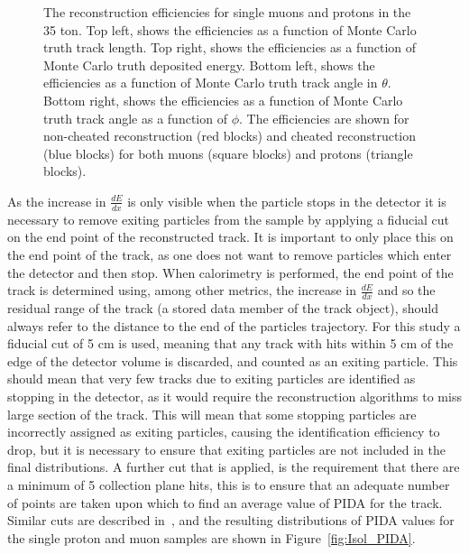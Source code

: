 \begin{figure}[h!]
  \caption[The reconstruction efficiencies for single muons and protons in the 35 ton.]
          {The reconstruction efficiencies for single muons and protons in the 35 ton. Top left, shows the efficiencies as a function of Monte Carlo truth track length. Top right, shows the efficiencies as a function of Monte Carlo truth deposited energy. Bottom left, shows the efficiencies as a function of Monte Carlo truth track angle in $\theta$. Bottom right, shows the efficiencies as a function of Monte Carlo truth track angle as a function of $\phi$. The efficiencies are shown for non-cheated reconstruction (red blocks) and cheated reconstruction (blue blocks) for both muons (square blocks) and protons (triangle blocks).}
  \label{fig:Isol_Effic}
\end{figure}

As the increase in $\frac{dE}{dx}$ is only visible when the particle stops in the detector it is necessary to remove exiting particles from the sample by applying a fiducial cut on the end point of the reconstructed track. It is important to only place this on the end point of the track, as one does not want to remove particles which enter the detector and then stop. When calorimetry is performed, the end point of the track is determined using, among other metrics, the increase in $\frac{dE}{dx}$ and so the residual range of the track (a stored data member of the track object), should always refer to the distance to the end of the particles trajectory. For this study a fiducial cut of 5 cm is used, meaning that any track with hits within 5 cm of the edge of the detector volume is discarded, and counted as an exiting particle. This should mean that very few tracks due to exiting particles are identified as stopping in the detector, as it would require the reconstruction algorithms to miss large section of the track. This will mean that some stopping particles are incorrectly assigned as exiting particles, causing the identification efficiency to drop, but it is necessary to ensure that exiting particles are not included in the final distributions. A further cut that is applied, is the requirement that there are a minimum of 5 collection plane hits, this is to ensure that an adequate number of points are taken upon which to find an average value of PIDA for the track. Similar cuts are described in~\citep{PIDA_Paper}, and the resulting distributions of PIDA values for the single proton and muon samples are shown in Figure~\ref{fig:Isol_PIDA}. \\

